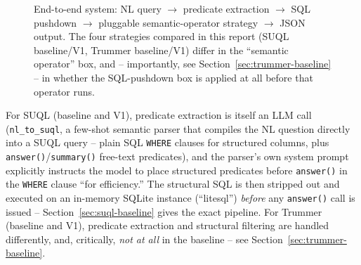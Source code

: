 \begin{figure}[h]
\centering
{}
\caption{End-to-end system: NL query $\to$ predicate extraction $\to$ SQL
pushdown $\to$ pluggable semantic-operator strategy $\to$ JSON output.
The four strategies compared in this report (SUQL baseline/V1, Trummer
baseline/V1) differ in the ``semantic operator'' box, and --
importantly, see Section~\ref{sec:trummer-baseline} -- in whether the
SQL-pushdown box is applied at all before that operator runs.}
\label{fig:system-overview}
\end{figure}

For SUQL (baseline and V1), predicate extraction is itself an LLM call
(\texttt{nl\_to\_suql}, a few-shot semantic parser that compiles the NL
question directly into a SUQL query -- plain SQL \texttt{WHERE} clauses
for structured columns, plus \texttt{answer()}/\texttt{summary()}
free-text predicates), and the parser's own system prompt explicitly
instructs the model to place structured predicates before \texttt{answer()}
in the \texttt{WHERE} clause ``for efficiency.'' The structural SQL is
then stripped out and executed on an in-memory SQLite instance
(``litesql'') \emph{before} any \texttt{answer()} call is issued --
Section~\ref{sec:suql-baseline} gives the exact pipeline. For Trummer
(baseline and V1), predicate extraction and structural filtering are
handled differently, and, critically, \emph{not at all} in the baseline
-- see Section~\ref{sec:trummer-baseline}.

